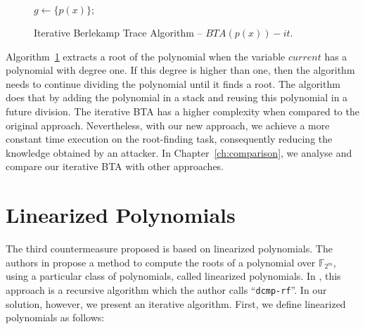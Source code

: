 \begin{figure}[ht]
\begin{algorithm}[H]
    $g \gets \{p(x)\};$ 
 \caption{Iterative Berlekamp Trace Algorithm -- $BTA(p(x))-it$.}
  \label{alg:ibta}
\end{algorithm}
\end{figure}

Algorithm~\ref{alg:ibta} extracts a root of the polynomial when the variable $current$ has a polynomial with degree one. If this degree is higher than one, then the algorithm needs to continue dividing the polynomial until it finds a root. The algorithm does that by adding the polynomial in a stack and reusing this polynomial in a future division. The iterative BTA has a higher complexity when compared to the original approach. Nevertheless, with our new approach, we achieve a more constant time execution on the root-finding task, consequently reducing the knowledge obtained by an attacker. In Chapter~\ref{ch:comparison}, we analyse and compare our iterative BTA with other approaches.

\section{Linearized Polynomials}
The third countermeasure proposed is based on linearized polynomials. The authors in \cite{fedorenko2002finding} propose a method to compute the roots of a polynomial over $\mathbb{F}_{2^m}$, using a particular class of polynomials, called linearized polynomials. In \cite{strenzke2012fast}, this approach is a recursive algorithm which the author calls ``\texttt{dcmp-rf}''. In our solution, however, we present an iterative algorithm. First, we define linearized polynomials as follows:

